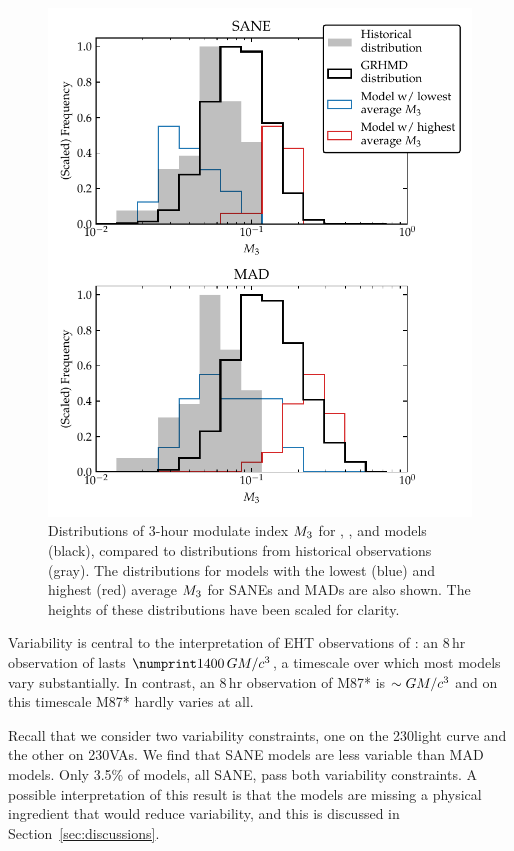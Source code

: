\begin{figure}
  \centering
  \includegraphics[width=\columnwidth]{./figures/mi_hist.pdf}
  \caption{Distributions of 3-hour modulate index $M_{3}$ for \bhac, \kharma, and \hamr models (black), compared to distributions from historical observations (gray).
The distributions for models with the lowest (blue) and highest (red) average $M_{3}$ for SANEs and MADs are also shown.
The heights of these distributions have been scaled for clarity.}
  \label{fig:cmp_ALMA_var}
\end{figure}

Variability is central to the interpretation of EHT observations of \sgra: an $8\,\mathrm{hr}$ observation of \sgra lasts $\no{1400}\,\tg$, a timescale over which most models vary substantially.
In contrast, an $8\,\mathrm{hr}$ observation of M87* is $\sim GM/c^3$ and on this timescale M87* hardly varies at all.

Recall that we consider two variability constraints, one on the 230\GHz light curve and the other on 230\GHz VAs.  We find that SANE models are less variable than MAD models. Only 3.5\% of models, all SANE, pass both variability constraints.  A possible interpretation of this result is that the models are missing a physical ingredient that would reduce variability, and this is discussed in Section~\ref{sec:discussions}.

